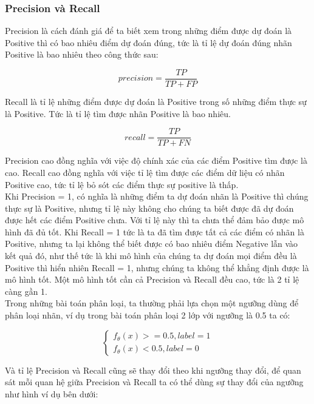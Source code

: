\subsubsection{Precision và Recall}
Precision là cách đánh giá để ta biết xem trong những điểm được dự đoán là Positive thì có bao nhiêu điểm dự đoán đúng, tức là tỉ lệ dự đoán đúng nhãn Positive là bao nhiêu theo công thức sau:
\begin{center}
        \[precision = \frac{TP}{TP+FP}\]
\end{center}
Recall là tỉ lệ những điểm được dự đoán là Positive trong số những điểm thực sự là Positive. Tức là tỉ lệ tìm được nhãn Positive là bao nhiêu.
\begin{center}
        \[recall = \frac{TP}{TP+FN}\]
\end{center}
Precision cao đồng nghĩa với việc độ chính xác của các điểm Positive tìm được là cao. Recall cao đồng nghĩa với việc tỉ lệ tìm được các điểm dữ liệu có nhãn Positive cao, tức tỉ lệ bỏ sót các điểm thực sự positive là thấp.\\
Khi Precision = 1, có nghĩa là những điểm ta dự đoán nhãn là Positive thì chúng thực sự là Positive, nhưng tỉ lệ này không cho chúng ta biết được đã dự đoán được hết các điểm Positive chưa. Với tỉ lệ này thì ta chưa thể đảm bảo được mô hình đã đủ tốt. Khi Recall = 1 tức là ta đã tìm được tất cả các điểm có nhãn là Positive, nhưng ta lại không thể biết được có bao nhiêu điểm Negative lẫn vào kết quả đó, như thế tức là khi mô hình của chúng ta dự đoán mọi điểm đều là Positive thì hiển nhiên Recall = 1, nhưng chúng ta không thể khẳng định được là mô hình tốt. Một mô hình tốt cần cả Precision và Recall đều cao, tức là 2 tỉ lệ càng gần 1. \\
Trong những bài toán phân loại, ta thường phải lựa chọn một ngưỡng dùng để phân loại nhãn, ví dụ trong bài toán phân loại 2 lớp với ngưỡng là 0.5 ta có:
\begin{center}
    \[\left\{ \begin{array}{l}
{f_\theta }(x) >  = 0.5,label = 1\\
{f_\theta }(x) < 0.5,label = 0
\end{array} \right.\]
\end{center}
Và tỉ lệ Precision và Recall cũng sẽ thay đổi theo khi ngưỡng thay đổi, để quan sát mỗi quan hệ giữa Precision và Recall ta có thể dùng sự thay đổi của ngưỡng như hình ví dụ bên dưới:
